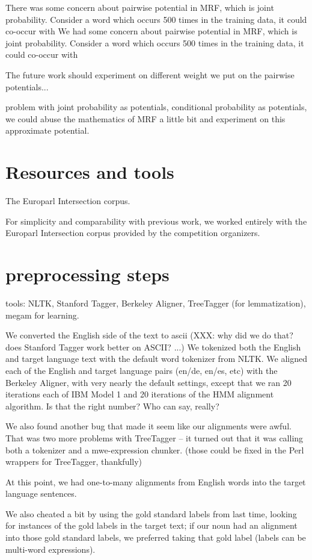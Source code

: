 \documentclass[11pt,letterpaper]{article}
\begin{document}
There was some concern about pairwise potential in MRF, which is joint probability. Consider a word which occurs 500 times in the training data, it could co-occur with
We had some concern about pairwise potential in MRF, which is joint
probability. Consider a word which occurs 500 times in the training data, it
could co-occur with

The future work should experiment on different weight we put on the pairwise
potentials...

problem with joint probability as potentials, conditional probability as
potentials, we could abuse the mathematics of MRF a little bit and experiment
on this approximate potential.

\section{Resources and tools}
The Europarl Intersection corpus.

For simplicity and comparability with previous work, we worked entirely with
the Europarl Intersection corpus provided by the competition organizers.
	

\section{preprocessing steps}
tools: NLTK, Stanford Tagger, Berkeley Aligner, TreeTagger (for lemmatization),
megam for learning.

We converted the English side of the text to ascii (XXX: why did we do that?
does Stanford Tagger work better on ASCII? ...) We tokenized both the English
and target language text with the default word tokenizer from NLTK.  We aligned
each of the English and target language pairs (en/de, en/es, etc) with the
Berkeley Aligner, with very nearly the default settings, except that we ran 20
iterations each of IBM Model 1 and 20 iterations of the HMM alignment
algorithm. Is that the right number? Who can say, really?

We also found another bug that made it seem like our alignments were awful.
That was two more problems with TreeTagger -- it turned out that it was calling
both a tokenizer and a mwe-expression chunker. (those could be fixed in the
Perl wrappers for TreeTagger, thankfully)

At this point, we had one-to-many alignments from English words into the target
language sentences.

We also cheated a bit by using the gold standard labels from last time, looking
for instances of the gold labels in the target text; if our noun had an
alignment into those gold standard labels, we preferred taking that gold label
(labels can be multi-word expressions).
\end{document}
